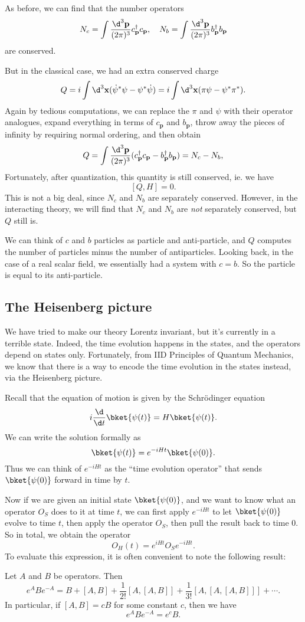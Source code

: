 \documentclass[a4paper]{article}
\begin{document}
As before, we can find that the number operators
\[
  N_c = \int \frac{\d^3 \mathbf{p}}{(2\pi)^3}c_\mathbf{p}^\dagger c_\mathbf{p},\quad N_b = \int \frac{\d^3 \mathbf{p}}{(2\pi)^3}b_\mathbf{p}^\dagger b_\mathbf{p}
\]
are conserved.

But in the classical case, we had an extra conserved charge
\[
  Q = i \int \d^3 \mathbf{x} (\dot{\psi}^* \psi - \psi^* \dot{\psi}) = i \int \d^3 \mathbf{x} (\pi \psi - \psi^* \pi^*).
\]
Again by tedious computations, we can replace the $\pi$ and $\psi$ with their operator analogues, expand everything in terms of $c_\mathbf{p}$ and $b_\mathbf{p}$, throw away the pieces of infinity by requiring normal ordering, and then obtain
\[
  Q = \int \frac{\d^3 \mathbf{p}}{(2\pi)^3} (c_\mathbf{p}^\dagger c_\mathbf{p} - b_\mathbf{p}^\dagger b_\mathbf{p}) = N_c - N_b,
\]
Fortunately, after quantization, this quantity is still conserved, ie. we have
\[
  [Q, H] = 0.
\]
This is not a big deal, since $N_c$ and $N_b$ are separately conserved. However, in the interacting theory, we will find that $N_c$ and $N_b$ are \emph{not} separately conserved, but $Q$ still is.

We can think of $c$ and $b$ particles as particle and anti-particle, and $Q$ computes the number of particles minus the number of antiparticles. Looking back, in the case of a real scalar field, we essentially had a system with $c = b$. So the particle is equal to its anti-particle.

\subsection{The Heisenberg picture}
We have tried to make our theory Lorentz invariant, but it's currently in a terrible state. Indeed, the time evolution happens in the states, and the operators depend on states only. Fortunately, from IID Principles of Quantum Mechanics, we know that there is a way to encode the time evolution in the states instead, via the Heisenberg picture.

Recall that the equation of motion is given by the Schr\"odinger equation
\[
  i \frac{\d}{\d t}\bket{\psi(t)} = H \bket{\psi(t)}.
\]
We can write the solution formally as
\[
  \bket{\psi(t)} = e^{-iHt} \bket{\psi(0)}.
\]
Thus we can think of $e^{-iHt}$ as the ``time evolution operator'' that sends $\bket{\psi(0)}$ forward in time by $t$.

Now if we are given an initial state $\bket{\psi(0)}$, and we want to know what an operator $O_S$ does to it at time $t$, we can first apply $e^{-iHt}$ to let $\bket{\psi(0)}$ evolve to time $t$, then apply the operator $O_S$, then pull the result back to time $0$. So in total, we obtain the operator
\[
  O_H(t) = e^{iHt} O_S e^{-iHt}.
\]
To evaluate this expression, it is often convenient to note the following result:
\begin{prop}
  Let $A$ and $B$ be operators. Then
  \[
    e^A B e^{-A} = B + [A, B] + \frac{1}{2!}[A, [A, B]] + \frac{1}{3!}[A, [A, [A, B]]] + \cdots.
  \]
  In particular, if $[A, B] = c B$ for some constant $c$, then we have
  \[
    e^A B e^{-A} = e^c B.
  \]
\end{prop}
\end{document}

